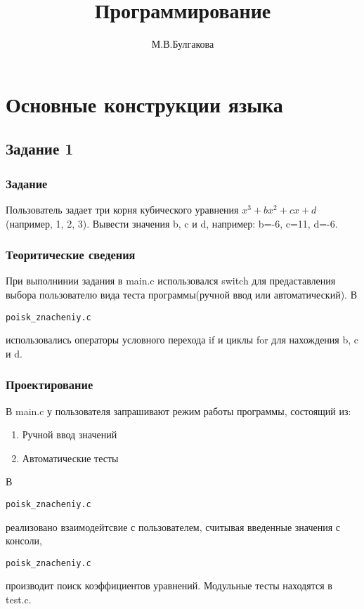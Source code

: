 \documentclass[12pt,a4paper]{report}
\author{М.В.Булгакова}
\title{Программирование}
\begin{document}
\listoftodos
\maketitle
\chapter{Основные конструкции языка}
\section{Задание 1}
\subsection{Задание}
Пользователь задает три корня кубического уравнения 
$x^3+bx^2+cx+d $
 (например, 1, 2, 3). Вывести значения b, c и d, например: b=-6, c=11, d=-6.
\subsection{Теоритические сведения}

При выполнинии задания в main.c использовался switch для предаставления выбора пользователю вида теста программы(ручной ввод или автоматический). В \begin{verbatim}poisk_znacheniy.c \end{verbatim} использовались операторы условного перехода if и циклы for для нахождения b, c и d.

\subsection{Проектирование}
В main.c у пользователя запрашивают режим работы программы, состоящий из:
\begin{enumerate}
\item Ручной ввод значений
\item Автоматические тесты
\end{enumerate}

В \begin{verbatim}poisk_znacheniy.c \end{verbatim}  реализовано взаимодейтсвие с пользователем, считывая введенные значения с консоли, \begin{verbatim}poisk_znacheniy.c \end{verbatim}  производит поиск коэффициентов уравнений.
Модульные тесты находятся в test.c.
\end{document}
